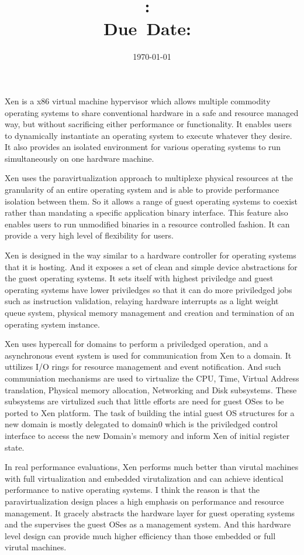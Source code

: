 \documentclass[12pt]{article}
\title{\textmd{\textbf{\hmwkClass:\
      \hmwkTitle}}\\\normalsize\small{Due\ Date:\
    \hmwkDueDate}\\}
\date{\today}
\author{\textbf{\hmwkAuthorName}}
\begin{document}
\maketitle

Xen is a x86 virtual machine hypervisor which allows multiple commodity
operating systems to share conventional hardware in a safe and
resource managed way, but without sacrificing either performance or
functionality. It enables users to dynamically instantiate an
operating system to execute whatever they desire. It also provides an
isolated environment for various operating systems to run
simultaneously on one hardware machine. 

Xen uses the paravirtualization approach to multiplexe physical
resources at the granularity of an entire operating system and is able
to provide performance isolation between them. So it allows a range of
guest operating systems to coexist rather than mandating a specific
application binary interface. This feature also enables users to run
unmodified binaries in a resource controlled fashion. It can provide a
very high level of flexibility for users.

Xen is designed in the way similar to a hardware controller for operating
systems that it is hosting. And it exposes a set of clean and simple
device abstractions for the guest operating systems. It sets itself with
highest priviledge and guest operating systems have lower priviledges
so that it can do more priviledged jobs such as instruction
validation, relaying hardware interrupts as a light weight queue
system, physical memory management and creation and termination of an
operating system instance. 

Xen uses hypercall for domains to perform a priviledged operation, and
a asynchronous event system is used for communication from Xen to a
domain. It uttilizes I/O rings for resource management and event
notification. And such communiation mechanisms are used to virtualize
the CPU, Time, Virtual Address translation, Physical memory
allocation, Networking and Disk subsystems. These subsystems are
virtulized such that little efforts are need for guest OSes to be
ported to Xen platform. The task of building the intial guest OS
structures for a new domain is mostly delegated to domain0 which is
the priviledged control interface to access the new Domain's memory
and inform Xen of initial register state.

In real performance evaluations, Xen performs much better than virutal
machines with full virtualization and embedded virutalization and can
achieve identical performance to native operating systems. I think the
reason is that the paravirtualization design places a high emphasis on
performance and resource management. It gracely abstracts the hardware
layer for guest operating systems and the supervises the guest OSes as
a management system. And this hardware level design can provide much
higher efficiency than those embedded or full virutal machines. 
\end{document}
